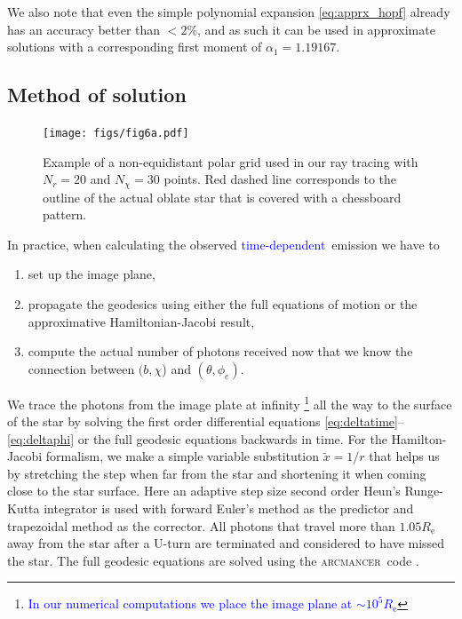 \documentclass{aa}
\newcommand{\refe}[1]{\textcolor{blue}{{#1}}}
\begin{document}
We also note that even the simple polynomial expansion \eqref{eq:apprx_hopf} already has an accuracy better than $<2\%$, and as such it can be used in approximate solutions with a corresponding first moment of $\alpha_1 = 1.19167$.




\subsection{Method of solution}\label{sect:num_methods}


\begin{figure}
\centering
\texttt{[image: figs/fig6a.pdf]}
\caption{\label{fig:grid}
Example of a non-equidistant polar grid used in our ray tracing with $N_r = 20$ and $N_{\chi} = 30$ points.
    Red dashed line corresponds to the outline of the actual oblate star that is covered with a chessboard pattern.
}
\end{figure}

In practice, when calculating the observed \refe{time-dependent} emission we have to 
\begin{enumerate}
    \item set up the image plane, 
    \item propagate the geodesics using either the full equations of motion or the approximative Hamiltonian-Jacobi result, 
    \item compute the actual number of photons received now that we know the connection between $(b,\chi$) and $(\theta, \phi_e)$.
\end{enumerate}

We trace the photons from the image plate at infinity%
\footnote{\refe{ In our numerical computations we place the image plane at $\sim 10^5 R_{\mathrm{e}}$}}
all the way to the surface of the star by solving the first order
differential equations \eqref{eq:deltatime}--\eqref{eq:deltaphi} or the full geodesic equations backwards in time.  
For the Hamilton-Jacobi formalism, we make a simple variable substitution $\tilde{x} = 1/r$
 that helps us by stretching the step when
far from the star and shortening it when coming close to the star
surface.  Here an adaptive step size second order Heun's Runge-Kutta
integrator is used with forward Euler's method as
the predictor and trapezoidal method as the corrector.  
All photons that travel more than $1.05 R_{\mathrm{e}}$ away from the star after a U-turn are
terminated and considered to have missed the star.
The full geodesic equations are solved using the \textsc{arcmancer} code \citep[see][and the related equations therein]{PRJ16}.
\end{document}
